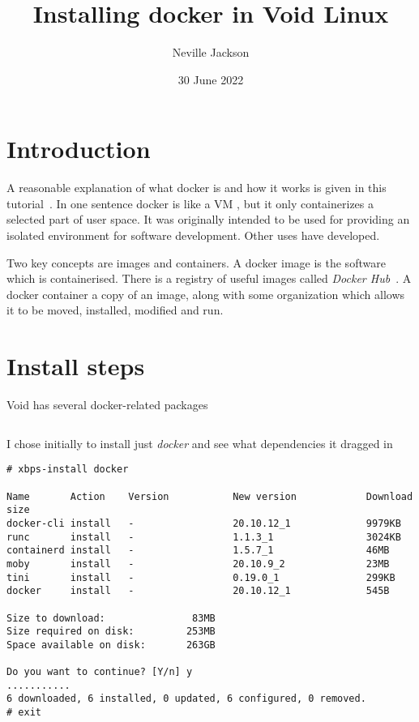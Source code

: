 \documentclass{article}  %
\title{Installing docker in Void Linux}
\author{Neville Jackson}
\date{30 June 2022}
\begin{document}
 

\maketitle      

\section{Introduction} 
A reasonable explanation of what docker is and how it works is given in this tutorial~\cite{dock:00}. In one sentence docker is like a VM , but it only containerizes a selected part of user space. It was originally intended to be used for providing an isolated environment for software development. Other uses have developed. 

Two key concepts are images and containers. A docker image is the software which is containerised. There is a registry of useful images called {\em Docker Hub}~\cite{dock:02}. A docker container  a copy of an image, along with some organization which  allows it to be moved, installed, modified and run.

\section{Install steps}
\label{sec:install}
Void has several docker-related packages
\begin{verbatim}
\end{verbatim}
I chose initially to install just {\em docker} and see what dependencies it dragged in
\begin{verbatim}
# xbps-install docker

Name       Action    Version           New version            Download size
docker-cli install   -                 20.10.12_1             9979KB 
runc       install   -                 1.1.3_1                3024KB 
containerd install   -                 1.5.7_1                46MB 
moby       install   -                 20.10.9_2              23MB 
tini       install   -                 0.19.0_1               299KB 
docker     install   -                 20.10.12_1             545B 

Size to download:               83MB
Size required on disk:         253MB
Space available on disk:       263GB

Do you want to continue? [Y/n] y
...........
6 downloaded, 6 installed, 0 updated, 6 configured, 0 removed.
# exit

\end{verbatim}
\end{document}
